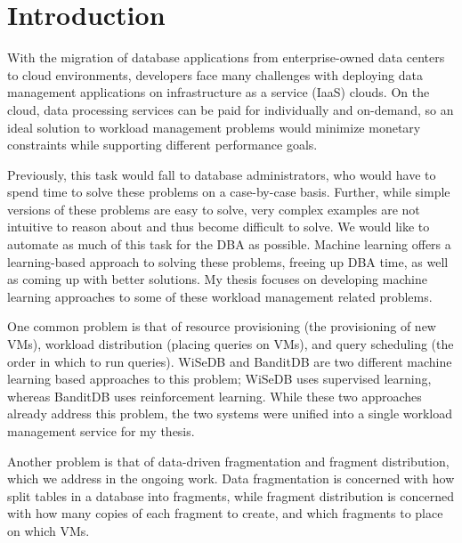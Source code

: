 \documentclass{brandiss}
\numberwithin{section}{chapter}
\numberwithin{figure}{chapter}
\theoremstyle{definition}
\theoremstyle{plain}
\theoremstyle{remark}
\begin{document}
\frontmatter

\makedisstitle


\tableofcontents %

\listoffigures %

\listoftables %


\mainmatter

\chapter{Introduction}

With the migration of database applications from enterprise-owned data centers to cloud environments, developers face many challenges with deploying data management applications on infrastructure as a service (IaaS) clouds. On the cloud, data processing services can be paid for individually and on-demand, so an ideal solution to workload management problems would minimize monetary constraints while supporting different performance goals.

Previously, this task would fall to database administrators, who would have to spend time to solve these problems on a case-by-case basis. Further, while simple versions of these problems are easy to solve, very complex examples are not intuitive to reason about and thus become difficult to solve. We would like to automate as much of this task for the DBA as possible. Machine learning offers a learning-based approach to solving these problems, freeing up DBA time, as well as coming up with better solutions. My thesis focuses on developing machine learning approaches to some of these workload management related problems.

One common problem is that of resource provisioning (the provisioning of new VMs), workload distribution (placing queries on VMs), and query scheduling (the order in which to run queries). WiSeDB and BanditDB are two different machine learning based approaches to this problem; WiSeDB uses supervised learning, whereas BanditDB uses reinforcement learning. While these two approaches already address this problem, the two systems were unified into a single workload management service for my thesis. 

Another problem is that of data-driven fragmentation and fragment distribution, which we address in the ongoing work. Data fragmentation is concerned with how split tables in a database into fragments, while fragment distribution is concerned with how many copies of each fragment to create, and which fragments to place on which VMs.
\end{document}
